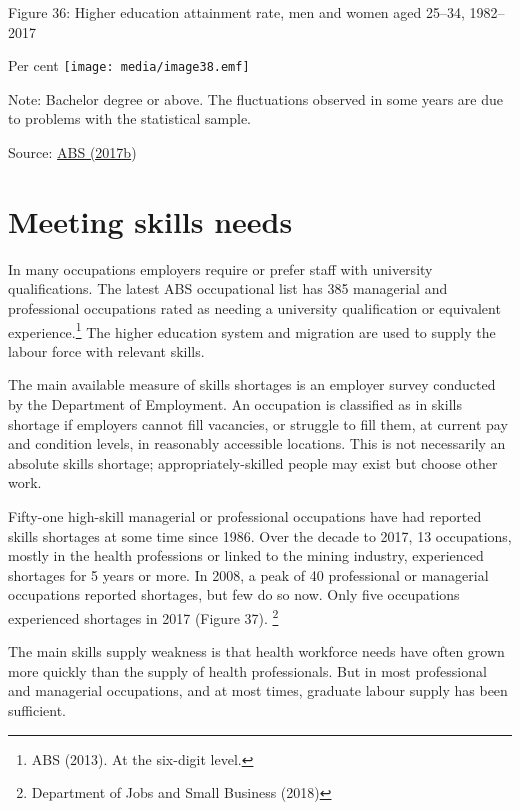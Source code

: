 \documentclass[]{book}
\begin{document}
\protect\hypertarget{_Ref400700286}{}{}Figure 36: Higher education attainment rate, men and women aged 25--34, 1982--2017

Per cent \texttt{[image: media/image38.emf]}

Note: Bachelor degree or above. The fluctuations observed in some years are due to problems with the statistical sample.

Source: \protect\hyperlink{_ENREF_5}{ABS (2017b})

\hypertarget{meeting-skills-needs}{%
\section{Meeting skills needs }\label{meeting-skills-needs}}

In many occupations employers require or prefer staff with university qualifications. The latest ABS occupational list has 385 managerial and professional occupations rated as needing a university qualification or equivalent experience.\footnote{ABS (2013). At the six-digit level.} The higher education system and migration are used to supply the labour force with relevant skills.

The main available measure of skills shortages is an employer survey conducted by the Department of Employment. An occupation is classified as in skills shortage if employers cannot fill vacancies, or struggle to fill them, at current pay and condition levels, in reasonably accessible locations. This is not necessarily an absolute skills shortage; appropriately-skilled people may exist but choose other work.

Fifty-one high-skill managerial or professional occupations have had reported skills shortages at some time since 1986. Over the decade to 2017, 13 occupations, mostly in the health professions or linked to the mining industry, experienced shortages for 5 years or more. In 2008, a peak of 40 professional or managerial occupations reported shortages, but few do so now. Only five occupations experienced shortages in 2017 (Figure 37). \footnote{Department of Jobs and Small Business (2018)}

The main skills supply weakness is that health workforce needs have often grown more quickly than the supply of health professionals. But in most professional and managerial occupations, and at most times, graduate labour supply has been sufficient.
\end{document}
